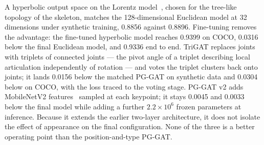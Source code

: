 A hyperbolic output space on the Lorentz model~\citep{nickel2018lorentz},
chosen for the tree-like topology of the skeleton,
matches the 128-dimensional Euclidean model at 32 dimensions under synthetic training,
0.8856 against 0.8896.
Fine-tuning removes the advantage: the fine-tuned hyperbolic model reaches 0.9399 on COCO,
0.0316 below the final Euclidean model, and 0.9336 end to end.
TriGAT replaces joints with triplets of connected joints --- the pivot angle of a triplet describing local articulation independently of rotation ---
and votes the triplet clusters back onto joints; it lands 0.0156 below the matched PG-GAT on synthetic data
and 0.0304 below on COCO, with the loss traced to the voting stage.
PG-GAT v2 adds MobileNetV2 features~\citep{sandler2018mobilenetv2} sampled at each keypoint; it stays 0.0045
and 0.0033 below the final model while adding a further $2.2 \times 10^{6}$ frozen parameters at inference.
Because it extends the earlier two-layer architecture, it does not isolate the effect of appearance on the final configuration.
None of the three is a better operating point than the position-and-type PG-GAT.